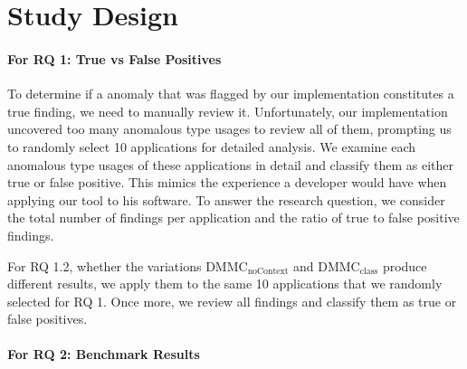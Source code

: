\section{Study Design}


\paragraph{For RQ 1: True vs False Positives}

To determine if a anomaly that was flagged by our implementation constitutes a true finding, we need to manually review it.
Unfortunately, our implementation uncovered too many anomalous type usages to review all of them, prompting us to randomly select 10 applications for detailed analysis.
We examine each anomalous type usages of these applications in detail and classify them as either true or false positive.
This mimics the experience a developer would have when applying our tool to his software.
To answer the research question, we consider the total number of findings per application and the ratio of true to false positive findings.

For RQ 1.2, whether the variations $\text{DMMC}_\text{noContext}$ and $\text{DMMC}_\text{class}$ produce different results, we apply them to the same 10 applications that we randomly selected for RQ 1.
Once more, we review all findings and classify them as true or false positives.

\paragraph{For RQ 2: Benchmark Results}

